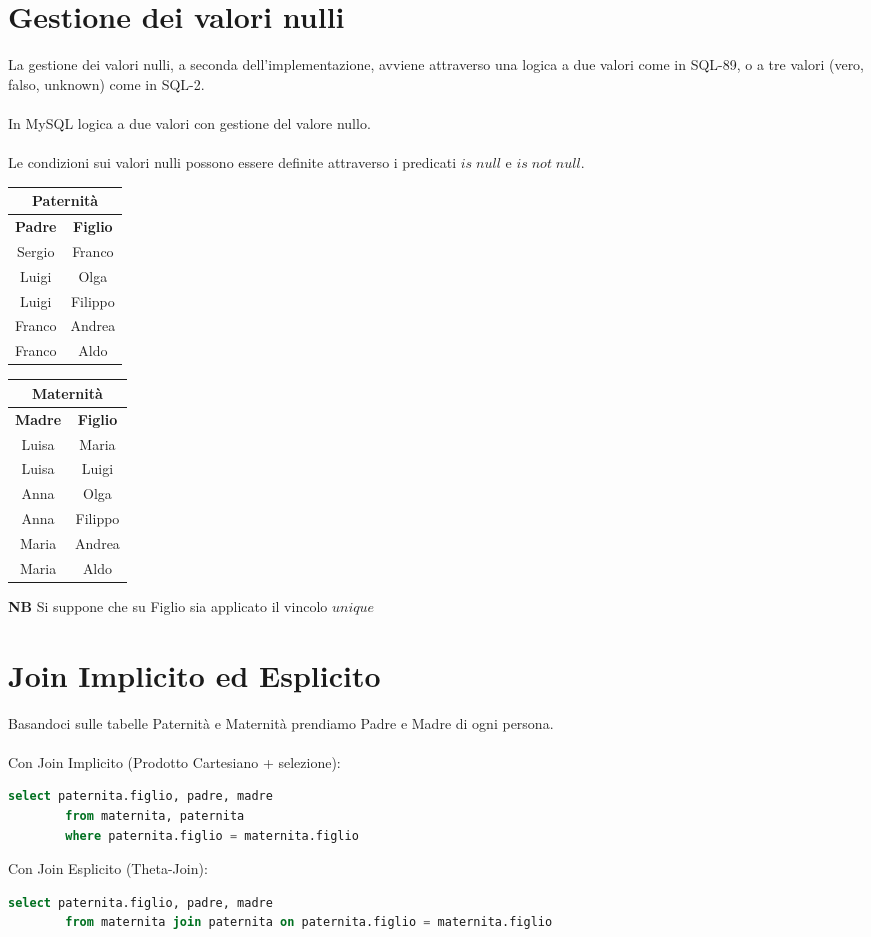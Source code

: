 \documentclass{article}
\begin{document}
	\section{Gestione dei valori nulli}
	La gestione dei valori nulli, a seconda dell’implementazione, avviene attraverso una logica a due valori come in SQL-89, o a tre valori (vero, falso, unknown) come in SQL-2.\\\\
	In MySQL logica a due valori con gestione del valore nullo.\\\\
	Le condizioni sui valori nulli possono essere definite attraverso i predicati $is \; null$ e $is \; not \; null$.
	\begin{center}
		\begin{tabular}{ |c|c| }
			\hline
			\multicolumn{2}{|c|}{Paternità}\\
			\hline
			\textbf{Padre} & \textbf{Figlio}\\
			\hline
			Sergio & Franco\\
			Luigi & Olga\\
			Luigi & Filippo\\
			Franco & Andrea\\
			Franco & Aldo\\
			\hline
		\end{tabular}
		\begin{tabular}{ |c|c| }
			\hline
			\multicolumn{2}{|c|}{Maternità}\\
			\hline
			\textbf{Madre} & \textbf{Figlio}\\
			\hline
			Luisa & Maria\\
			Luisa & Luigi\\
			Anna & Olga\\
			Anna & Filippo\\
			Maria & Andrea\\
			Maria & Aldo\\
			\hline
		\end{tabular}
	\end{center}
	\textbf{NB} Si suppone che su Figlio sia applicato il vincolo $unique$
	\section{Join Implicito ed Esplicito}
	Basandoci sulle tabelle Paternità e Maternità prendiamo Padre e Madre di ogni persona.\\\\
	Con Join Implicito (Prodotto Cartesiano + selezione):
	\begin{lstlisting}[language=SQL]
		select paternita.figlio, padre, madre 
		from maternita, paternita 
		where paternita.figlio = maternita.figlio
	\end{lstlisting}
	Con Join Esplicito (Theta-Join):
	\begin{lstlisting}[language=SQL]
		select paternita.figlio, padre, madre 
		from maternita join paternita on paternita.figlio = maternita.figlio
	\end{lstlisting}
\end{document}
